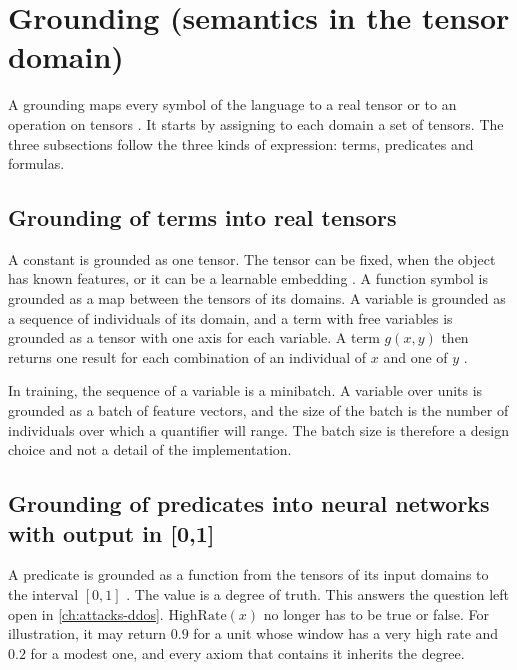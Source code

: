 \section{Grounding (semantics in the tensor domain)}
\label{sec:grounding}

A grounding maps every symbol of the language to a real tensor or to an
operation on tensors \citep{badreddine2022ltn}. It starts by assigning to each
domain a set of tensors. The three subsections follow the three kinds of
expression: terms, predicates and formulas.

\subsection{Grounding of terms into real tensors}
\label{sec:grounding-terms}

A constant is grounded as one tensor. The tensor can be fixed, when the object
has known features, or it can be a learnable embedding
\citep{badreddine2022ltn}. A function symbol is grounded as a map between the
tensors of its domains. A variable is grounded as a sequence of individuals of
its domain, and a term with free variables is grounded as a tensor with one
axis for each variable. A term $g(x,y)$ then returns one result for each
combination of an individual of $x$ and one of $y$ \citep{badreddine2022ltn}.

In training, the sequence of a variable is a minibatch. A variable over
units is grounded as a batch of feature vectors, and the size of the batch
is the number of individuals over which a quantifier will range. The batch
size is therefore a design choice and not a detail of the implementation.

\subsection{Grounding of predicates into neural networks with output in [0,1]}
\label{sec:grounding-predicates}

A predicate is grounded as a function from the tensors of its input domains to
the interval $[0,1]$ \citep{badreddine2022ltn}. The value is a degree of
truth. This answers the question left open in \cref{ch:attacks-ddos}.
$\mathrm{HighRate}(x)$ no longer has to be true or false. For illustration, it
may return $0.9$ for a unit whose window has a very high rate and $0.2$ for a
modest one, and every axiom that contains it inherits the degree.

